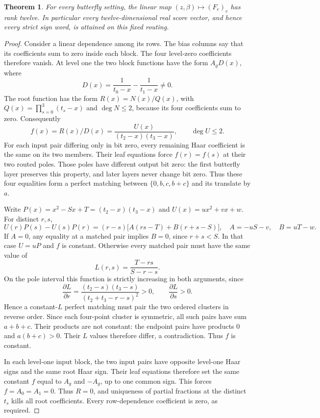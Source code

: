 \documentclass[11pt]{article}
\newtheorem{theorem}{Theorem}
\begin{document}
\begin{theorem}
For every butterfly setting, the linear map $(z,\beta)\mapsto(F_e)_e$
has rank twelve. In particular every twelve-dimensional real score vector,
and hence every strict sign word, is attained on this fixed routing.
\end{theorem}
\begin{proof}
Consider a linear dependence among its rows. The bias columns say that
its coefficients sum to zero inside each block. The four level-zero
coefficients therefore vanish. At level one the two block functions have
the form $A_gD(x)$, where
\[
 D(x)=\frac1{t_0-x}-\frac1{t_1-x}\ne0.
\]
The root function has the form $R(x)=N(x)/Q(x)$, with
$Q(x)=\prod_{s=0}^3(t_s-x)$ and $\deg N\le2$, because its four
coefficients sum to zero. Consequently
\[
 f(x)=R(x)/D(x)=\frac{U(x)}{(t_2-x)(t_3-x)},\qquad \deg U\le2.
\]
For each input pair differing only in bit zero, every remaining Haar
coefficient is the same on its two members. Their leaf equations force
$f(r)=f(s)$ at their two routed poles. Those poles have different output
bit zero: the first butterfly layer preserves this property, and later
layers never change bit zero. Thus these four equalities form a perfect
matching between $\{0,b,c,b+c\}$ and its translate by $a$.

Write $P(x)=x^2-Sx+T=(t_2-x)(t_3-x)$ and
$U(x)=ux^2+vx+w$. For distinct $r,s$,
\[
 U(r)P(s)-U(s)P(r)
 =(r-s)\bigl[A(rs-T)+B(r+s-S)\bigr],
 \quad A=-uS-v,\quad B=uT-w.
\]
If $A=0$, any equality at a matched pair implies $B=0$, since
$r+s<S$. In that case $U=uP$ and $f$ is constant. Otherwise every
matched pair must have the same value of
\[
 L(r,s)=\frac{T-rs}{S-r-s}.
\]
On the pole interval this function is strictly increasing in both
arguments, since
\[
 \frac{\partial L}{\partial r}
 =\frac{(t_2-s)(t_3-s)}{(t_2+t_3-r-s)^2}>0,
 \qquad
 \frac{\partial L}{\partial s}>0.
\]
Hence a constant-$L$ perfect matching must pair the two ordered clusters
in reverse order. Since each four-point cluster is symmetric, all such
pairs have sum $a+b+c$. Their products are not constant: the endpoint
pairs have products $0$ and $a(b+c)>0$. Their $L$ values therefore differ,
a contradiction. Thus $f$ is constant.

In each level-one input block, the two input pairs have opposite
level-one Haar signs and the same root Haar sign. Their leaf equations
therefore set the same constant $f$ equal to $A_g$ and $-A_g$, up to one
common sign. This forces $f=A_0=A_1=0$. Thus $R=0$, and uniqueness of
partial fractions at the distinct $t_s$ kills all root coefficients.
Every row-dependence coefficient is zero, as required.
\end{proof}
\end{document}
